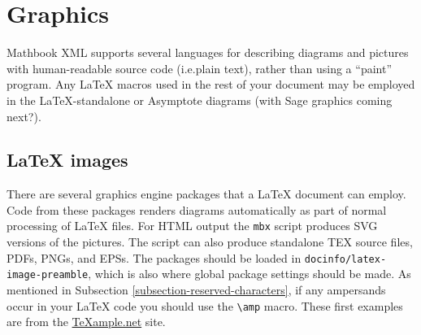 \documentclass[10pt,]{article}
\theoremstyle{plain}
\theoremstyle{definition}
\theoremstyle{definition}
\theoremstyle{definition}
\theoremstyle{definition}
\theoremstyle{definition}
\theoremstyle{definition}
\numberwithin{equation}{section}
\newcommand{\amp}{&}
\begin{document}
\section[{Graphics}]{Graphics}\label{graphics}
\hypertarget{p-252}{}%
Mathbook XML supports several languages for describing diagrams and pictures with human-readable source code (i.e.\@ plain text), rather than using a ``paint'' program.  Any \LaTeX{} macros used in the rest of your document may be employed in the \LaTeX{}-standalone or Asymptote diagrams (with Sage graphics coming next?).%
\typeout{************************************************}
\typeout{************************************************}
\subsection[{\LaTeX{} images}]{\LaTeX{} images}\label{subsection-19}
\hypertarget{p-253}{}%
There are several graphics engine packages that a \LaTeX{} document can employ. Code from these packages renders diagrams automatically as part of normal processing of \LaTeX{} files.  For HTML output the \lstinline?mbx? script produces SVG versions of the pictures.  The script can also produce standalone TEX source files, PDFs, PNGs, and EPSs. The packages should be loaded in \lstinline?docinfo/latex-image-preamble?, which is also where global package settings should be made. As mentioned in Subsection \hyperref[subsection-reserved-characters]{\ref{subsection-reserved-characters}}, if any ampersands occur in your \LaTeX{} code you should use the \lstinline?\amp? macro. These first examples are from the \href{http://www.texample.net/tikz/examples/}{TeXample.net} site.%
\end{document}
